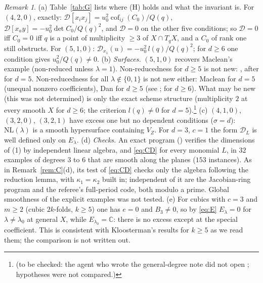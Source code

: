 \documentclass[10pt]{article}
\numberwithin{equation}{section}
\theoremstyle{remark}
\newtheorem{remark}[theorem]{Remark}
\newcommand{\CC}{\mathbb{C}}
\newcommand{\NL}{\mathrm{NL}}
\newcommand{\VZ}{V_Z}
\newcommand{\cD}{\mathcal{D}}
\newcommand{\tbc}[1]{\footnote{(to be checked: #1)}}
\begin{document}
\begin{remark}\label{rem:D}
(a) Table~\ref{tab:G} lists where (H) holds and what the invariant is. For $(4,2,0)$, exactly:
$\cD[x_ix_j]=u_0^2\operatorname{cof}_{ij}(C_0)/Q(q)$, $\cD[x_ay]=-u_0^2\det C_0/Q(q)^2$, and $\cD=0$ on the
other five conditions; so $\cD=0$ iff $C_0=0$ iff $q$ is a point of multiplicity $\ge3$ of $X\cap T_qX$, and a
$C_0$ of rank one still obstructs. For $(5,1,0)$: $\cD_{x_1}(u)=-u_0^2\,l(q)/Q(q)^2$; for $d\ge6$ one
condition gives $u_0^2/Q(q)\ne0$.
(b) \emph{Surfaces.} $(5,1,0)$ recovers Maclean's example (non-reduced unless $\lambda=1$). Non-reducedness for
$d\ge5$ is not new: \cite[Theorem~1.3]{Dan}, after \cite{Mac2} for $d=5$. Non-reducedness for all
$\lambda\notin\{0,1\}$ is not new either: Maclean for $d=5$ (unequal nonzero coefficients), Dan for $d\ge5$ (see
\cite[Prop.~3.1]{Kl2}; \cite{Dan2} for $d\ge6$). What may be new (this was not determined) is only the exact
scheme structure (multiplicity $2$ at every smooth $X$ for $d\ge6$; the criterion $l(q)\ne0$ for
$d=5$).\tbc{the agent who wrote the general-degree note did not open \cite{Mac1,Mac2,Dan}; hypotheses were
not compared.}
(c) $(4,1,0)$, $(3,2,0)$, $(3,2,1)$ have excess one but no dependent conditions ($\sigma=d$): $\NL(\lambda)$ is
a smooth hypersurface containing $\VZ$. For $d=3$, $c=1$ the form $\cD_L$ is well defined only on $E_\lambda$.
(d) \emph{Checks.} An exact program () verifies the dimensions of (1) by independent
linear algebra, and \eqref{eq:CD} for every monomial $L$, in $32$ examples of degrees $3$ to $6$ that are smooth
along the planes ($153$ instances). As in Remark~\ref{rem:C}(d), its test of \eqref{eq:CD} checks only the
algebra following the reduction lemma, with $\kappa_1=\kappa_2$ built in; independent of it are the
Jacobian-ring program  and the referee's full-period code, both modulo a prime. Global
smoothness of the explicit examples was not tested.
(e) For cubics with $c=3$ and $m\ge2$ (cubic $2k$-folds, $k\ge5$) one has $e=0$ and $B_3\ne0$, so by
\eqref{eq:E} $E_\lambda=0$ for $\lambda\ne\lambda_0$ at general $X$, while $E_{\lambda_0}=\CC$: there is no
excess except at the special coefficient. This is consistent with Kloosterman's results for $k\ge5$ as we read
them; the comparison is not written out.
\end{remark}
\end{document}
